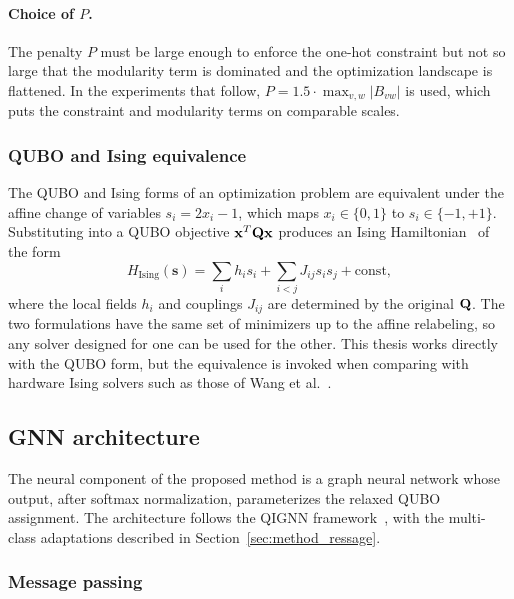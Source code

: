 \paragraph{Choice of $P$.}
The penalty $P$ must be large enough to enforce the one-hot
constraint but not so large that the modularity term is dominated
and the optimization landscape is flattened. In the experiments
that follow, $P = 1.5 \cdot \max_{v,w} |B_{vw}|$ is used, which
puts the constraint and modularity terms on comparable scales.


\subsubsection{QUBO and Ising equivalence}
\label{sec:method_qubo_ising}

The QUBO and Ising forms of an optimization problem are equivalent
under the affine change of variables $s_i = 2 x_i - 1$, which maps
$x_i \in \{0, 1\}$ to $s_i \in \{-1, +1\}$. Substituting into a
QUBO objective $\mathbf{x}^T \mathbf{Q} \mathbf{x}$ produces an Ising
Hamiltonian~\cite{lucas2014ising} of the form
\begin{equation*}
    H_{\mathrm{Ising}}(\mathbf{s}) = \sum_i h_i s_i + \sum_{i < j} J_{ij}
    s_i s_j + \mathrm{const},
\end{equation*}
where the local fields $h_i$ and couplings $J_{ij}$ are determined
by the original $\mathbf{Q}$. The two formulations have the same set of
minimizers up to the affine relabeling, so any solver designed for
one can be used for the other. This thesis works directly with the
QUBO form, but the equivalence is invoked when comparing with
hardware Ising solvers such as those of Wang et
al.~\cite{wang2024quantum}.

\subsection{GNN architecture}
\label{sec:method_gnn}

The neural component of the proposed method is a graph neural
network whose output, after softmax normalization, parameterizes
the relaxed QUBO assignment. The architecture follows the QIGNN
framework~\cite{qignn2026}, with the multi-class adaptations
described in Section~\ref{sec:method_ressage}.

\subsubsection{Message passing}
\label{sec:method_messagepassing}

